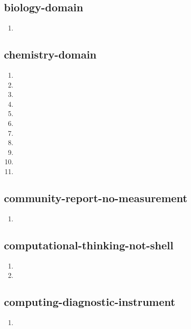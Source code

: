 \documentclass{article}
\begin{document}
\subsection{biology-domain}
\begin{enumerate}
\item {}
\end{enumerate}

\subsection{chemistry-domain}
\begin{enumerate}
\item {}
\item {}
\item {}
\item {}
\item {}
\item {}
\item {}
\item {}
\item {}
\item {}
\item {}
\end{enumerate}

\subsection{community-report-no-measurement}
\begin{enumerate}
\item {}
\end{enumerate}

\subsection{computational-thinking-not-shell}
\begin{enumerate}
\item {}
\item {}
\end{enumerate}

\subsection{computing-diagnostic-instrument}
\begin{enumerate}
\item {}
\end{enumerate}
\end{document}
